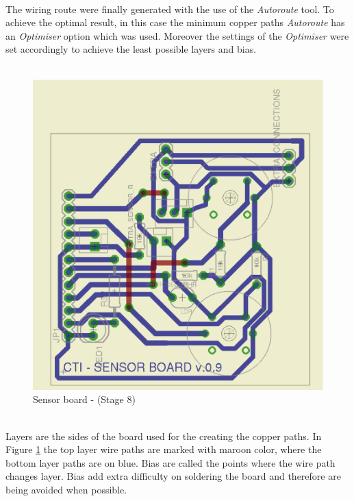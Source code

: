 \documentclass[12pt,a4paper]{report}
\begin{document}
\ \\
The wiring route were finally generated with the use of the \textit{Autoroute} tool. To achieve the optimal result, in this case the minimum copper paths \textit{Autoroute} has an \textit{Optimiser} option which was used. Moreover the settings of the \textit{Optimiser} were set accordingly to achieve the least possible layers and bias.\\
\ \\
\begin{figure}[H]
\centering
\includegraphics*[scale=0.25]{sens_brd_s8}
\caption{Sensor board -  (Stage 8)}
\label{Sensor-brd-s8}
\end{figure}
\ \\
Layers are the sides of the board used for the creating the copper paths. In Figure \ref{Sensor-brd-s8} the top layer wire paths are marked with maroon color, where the bottom layer paths are on blue. Bias are called the points where the wire path changes layer. Bias add extra difficulty on soldering the board and therefore are being avoided when possible.\\
\ \\
%
\end{document}
